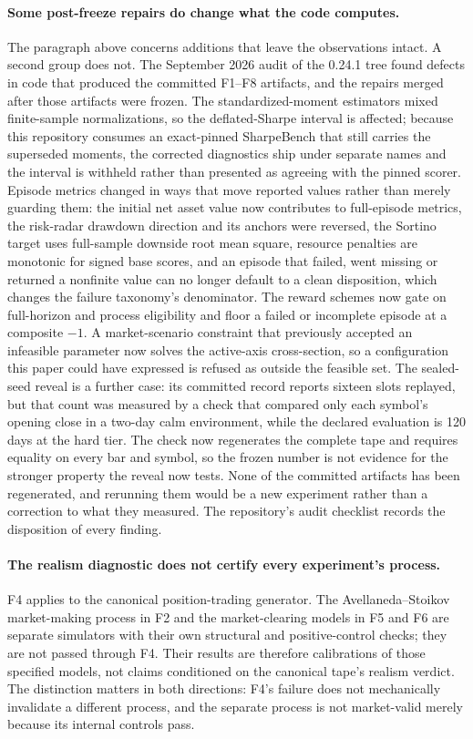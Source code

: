 \paragraph{Some post-freeze repairs do change what the code computes.} The paragraph above concerns additions that leave the observations intact. A second group does not. The September 2026 audit of the 0.24.1 tree found defects in code that produced the committed F1--F8 artifacts, and the repairs merged after those artifacts were frozen. The standardized-moment estimators mixed finite-sample normalizations, so the deflated-Sharpe interval is affected; because this repository consumes an exact-pinned SharpeBench that still carries the superseded moments, the corrected diagnostics ship under separate names and the interval is withheld rather than presented as agreeing with the pinned scorer. Episode metrics changed in ways that move reported values rather than merely guarding them: the initial net asset value now contributes to full-episode metrics, the risk-radar drawdown direction and its anchors were reversed, the Sortino target uses full-sample downside root mean square, resource penalties are monotonic for signed base scores, and an episode that failed, went missing or returned a nonfinite value can no longer default to a clean disposition, which changes the failure taxonomy's denominator. The reward schemes now gate on full-horizon and process eligibility and floor a failed or incomplete episode at a composite $-1$. A market-scenario constraint that previously accepted an infeasible parameter now solves the active-axis cross-section, so a configuration this paper could have expressed is refused as outside the feasible set. The sealed-seed reveal is a further case: its committed record reports sixteen slots replayed, but that count was measured by a check that compared only each symbol's opening close in a two-day calm environment, while the declared evaluation is 120 days at the hard tier. The check now regenerates the complete tape and requires equality on every bar and symbol, so the frozen number is not evidence for the stronger property the reveal now tests. None of the committed artifacts has been regenerated, and rerunning them would be a new experiment rather than a correction to what they measured. The repository's audit checklist records the disposition of every finding.

\paragraph{The realism diagnostic does not certify every experiment's process.} F4 applies to the canonical position-trading generator. The Avellaneda--Stoikov market-making process in F2 and the market-clearing models in F5 and F6 are separate simulators with their own structural and positive-control checks; they are not passed through F4. Their results are therefore calibrations of those specified models, not claims conditioned on the canonical tape's realism verdict. The distinction matters in both directions: F4's failure does not mechanically invalidate a different process, and the separate process is not market-valid merely because its internal controls pass.

